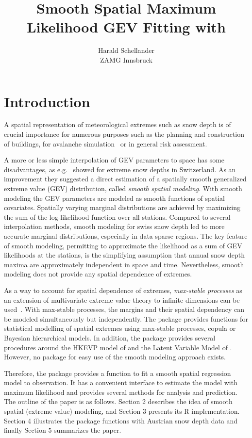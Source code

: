 \documentclass[a4paper,nojss]{jss}
\title{Smooth Spatial Maximum Likelihood GEV Fitting with \pkg{gevreg}}
\author{Harald Schellander\\ZAMG Innsbruck}
\newcommand{\CRANpkg}[1]{\href{http://CRAN.R-project.org/package=#1}{\pkg{#1}}}%
\begin{document}


\section{Introduction}
\label{sec:intro}
A spatial representation of meteorological extremes such as snow depth is of crucial importance for numerous purposes such as the planning and construction of buildings, for avalanche simulation~\citep{HandbuchTechnischerLawinenschutz2011} or in general risk assessment. 

A more or less simple interpolation of GEV parameters to space has some disadvantages, as e.g.~\cite{BlanchetLehning2010} showed for extreme snow depths in Switzerland. As an improvement they suggested a direct estimation of a spatially smooth generalized extreme value (GEV) distribution, called \emph{smooth spatial modeling}. With smooth modeling the GEV parameters are modeled as smooth functions of spatial covariates. Spatially varying marginal distributions are achieved by maximizing the sum of the log-likelihood function over all stations. Compared to several interpolation methods, smooth modeling for swiss snow depth led to more accurate marginal distributions, especially in data sparse regions. The key feature of smooth modeling, permitting to approximate the likelihood as a sum of GEV likelihoods at the stations, is the simplifying assumption that annual snow depth maxima are approximately independent in space and time. Nevertheless, smooth modeling does not provide any spatial dependence of extremes. 

As a way to account for spatial dependence of extremes, \emph{max-stable processes} as an extension of multivariate extreme value theory to infinite dimensions can be used~\citep{Haan1984}. With max-stable processes, the margins and their spatial dependency can be modeled simultaneously but independently. The \CRANpkg{SpatialExtremes} package provides functions for statistical modelling of spatial extremes using max-stable processes, copula or Bayesian hierarchical models. In addition, the \CRANpkg{hkevp} package provides several procedures around the HKEVP model of \cite{Reich2012} and the Latent Variable Model of \cite{DavisonRibatetPadoan2012}. However, no package for easy use of the smooth modeling approach exists. 

Therefore, the  package provides a function to fit a smooth spatial regression model to observation. It has a convenient interface to estimate the model with maximum likelihood and provides several methods for analysis and prediction. 
The outline of the paper is as follows. Section 2 describes the idea of smooth spatial (extreme value) modeling, and Section 3 presents its R implementation. Section 4 illustrates the package
functions with Austrian snow depth data and finally Section 5 summarizes the paper.
\end{document}
